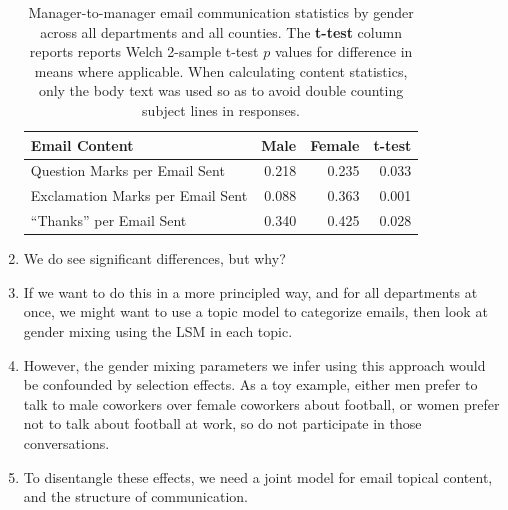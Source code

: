 \documentclass[fleqn]{MJDArticle}
\begin{document}
\begin{enumerate}
	\begin{table}[H]
	\centering
	\begin{tabular}{m{2in}rrr}
	\toprule
	 \textbf{Email Content} & \textbf{Male} & \textbf{Female} & \textbf{t-test} \\
	 \midrule
	 Question Marks per Email Sent & 0.218 & 0.235 & 0.033\\
	 Exclamation Marks per Email Sent & 0.088 & 0.363 & 0.001\\
	 ``Thanks'' per Email Sent & 0.340 & 0.425 & 0.028 \\
	\bottomrule
	\end{tabular}
		\caption{\label{tab:Gender Aggregate Stats} Manager-to-manager email communication statistics by gender across all departments and all counties. The \textbf{t-test} column reports reports Welch 2-sample t-test $p$ values for difference in means where applicable. When calculating content statistics, only the body text was used so as to avoid double counting subject lines in responses.}
	\end{table}
	
	\item We do see significant differences, but why?
	
	\item If we want to do this in a more principled way, and for all departments at once, we might want to use a topic model to categorize emails, then look at gender mixing using the LSM in each topic.
	\item However, the gender mixing parameters we infer using this approach would be confounded by selection effects. As a toy example, either men prefer to talk to male coworkers over female coworkers about football, or women prefer not to talk about football at work, so do not participate in those conversations. 
	\item To disentangle these effects, we need a joint model for email topical content, and the structure of communication.
\end{enumerate}
\end{document}
